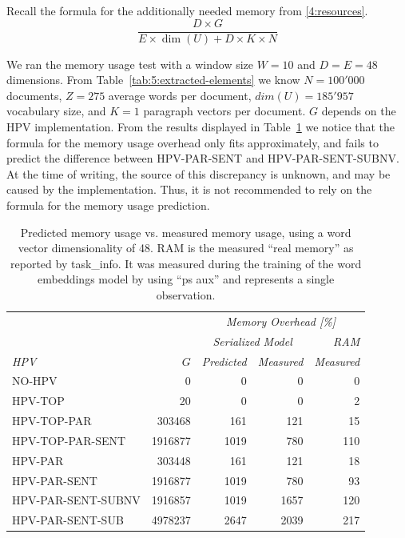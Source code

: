 Recall the formula for the additionally needed memory from \ref{4:resources}.
\begin{displaymath}
\frac{D \times G}{E \times \dim(U) +D \times K \times N}
\end{displaymath}


We ran the memory usage test with a window size $W=10$ and $D=E=48$ dimensions. From Table~\ref{tab:5:extracted-elements} we know $N=100'000$ documents, $Z=275$ average words per document, $dim(U)=185'957$ vocabulary size, and $K=1$ paragraph vectors per document. $G$ depends on the HPV implementation. From the results displayed in Table~\ref{tab:5:memory-usage} we notice that the formula for the memory usage overhead only fits approximately, and fails to predict the difference between HPV-PAR-SENT and HPV-PAR-SENT-SUBNV\@. At the time of writing, the source of this discrepancy is unknown, and may be caused by the implementation. Thus, it is not recommended to rely on the formula for the memory usage prediction.

\begin{table}
	\centering
	\caption{Predicted memory usage vs. measured memory usage, using a word vector dimensionality of 48. RAM is the measured ``real memory'' as reported by task\_info. It was measured during the training of the word embeddings model by using ``ps aux'' and represents a single observation.}
	\label{tab:5:memory-usage}
	\begin{tabular}{lrrrr}
		\toprule
		& & \multicolumn{3}{c}{\emph{Memory Overhead [\%]}} \tabularnewline
		& & \multicolumn{2}{c}{\emph{Serialized Model}} & \emph{RAM} \tabularnewline
		\emph{HPV}& \emph{$G$}& \emph{Predicted}& \emph{Measured}& \emph{Measured}\tabularnewline
		\midrule
		NO-HPV& 0& 0& 0& 0 \tabularnewline
		HPV-TOP& 20& 0& 0& 2 \tabularnewline
		HPV-TOP-PAR& 303468& 161& 121& 15 \tabularnewline
		HPV-TOP-PAR-SENT& 1916877& 1019& 780& 110 \tabularnewline
		HPV-PAR& 303448& 161& 121& 18 \tabularnewline
		HPV-PAR-SENT& 1916877& 1019& 780& 93 \tabularnewline
		HPV-PAR-SENT-SUBNV& 1916857& 1019& 1657& 120 \tabularnewline
		HPV-PAR-SENT-SUB& 4978237& 2647& 2039& 217 \tabularnewline
		\bottomrule
	\end{tabular}
\end{table}
























